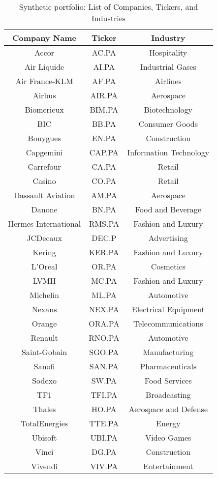 \documentclass[hidelinks,11pts]{article}
\DeclareMathOperator{\1}{\mathbbm{1}}
\begin{document}
\begin{table}[h]
    \centering
    \begin{tabular}{|c|c|c|}
    \hline
    \textbf{Company Name} & \textbf{Ticker} & \textbf{Industry} \\
    \hline
Accor & AC.PA & Hospitality \\
Air Liquide & AI.PA & Industrial Gases \\
Air France-KLM & AF.PA & Airlines \\
Airbus & AIR.PA & Aerospace \\
Biomerieux & BIM.PA & Biotechnology \\
BIC & BB.PA & Consumer Goods \\
Bouygues & EN.PA & Construction \\
Capgemini & CAP.PA & Information Technology \\
Carrefour & CA.PA & Retail \\
Casino & CO.PA & Retail \\
Dassault Aviation & AM.PA & Aerospace \\
Danone & BN.PA & Food and Beverage \\
Hermes International & RMS.PA & Fashion and Luxury \\
JCDecaux & DEC.P & Advertising \\
Kering & KER.PA & Fashion and Luxury \\
L'Oreal & OR.PA & Cosmetics \\
LVMH & MC.PA & Fashion and Luxury \\
Michelin & ML.PA & Automotive \\
Nexans & NEX.PA & Electrical Equipment \\
Orange & ORA.PA & Telecommunications \\
Renault & RNO.PA & Automotive \\
Saint-Gobain & SGO.PA & Manufacturing \\
Sanofi & SAN.PA & Pharmaceuticals \\
Sodexo & SW.PA & Food Services \\
TF1 & TFI.PA & Broadcasting \\
Thales & HO.PA & Aerospace and Defense \\
TotalEnergies & TTE.PA & Energy \\
Ubisoft & UBI.PA & Video Games \\
Vinci & DG.PA & Construction \\
Vivendi & VIV.PA & Entertainment \\
\hline
\end{tabular}
\caption{Synthetic portfolio: List of Companies, Tickers, and Industries}
\label{tab:companies}
\end{table}
\end{document}

